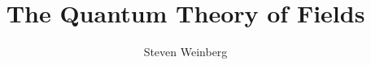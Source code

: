 \documentclass[11pt,a4paper]{article}
\title{The Quantum Theory of Fields}
\author{Steven Weinberg}
\affiliation{University of Texas at Austin}
\begin{document}
\maketitle
\flushbottom


















\end{document}
